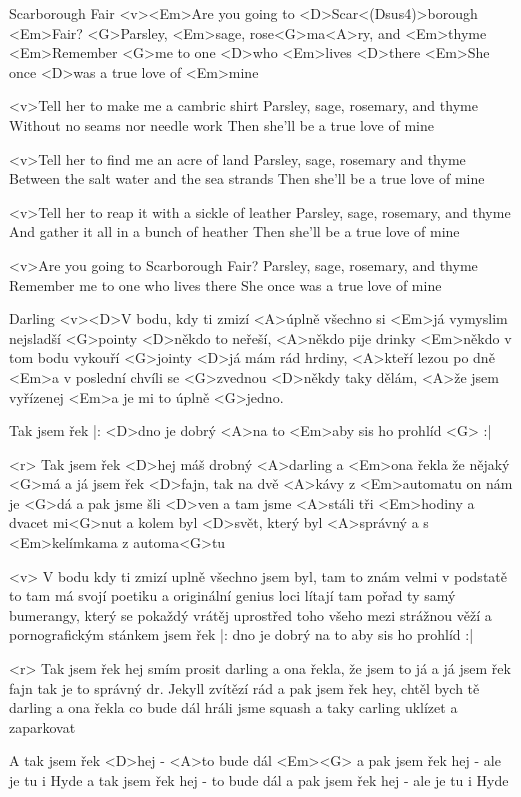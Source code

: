 \begin{song}[Lidová]{83}{Scarborough Fair}{}
	<v><Em>Are you going to <D>Scar<(Dsus4)>borough <Em>Fair?
	<G>Parsley, <Em>sage, rose<G>ma<A>ry, and <Em>thyme
	<Em>Remember <G>me to one <D>who <Em>lives <D>there
	<Em>She once <D>was a true love of <Em>mine

	<v>Tell her to make me a cambric shirt
	Parsley, sage, rosemary, and thyme
	Without no seams nor needle work
	Then she'll be a true love of mine

	<v>Tell her to find me an acre of land
	Parsley, sage, rosemary and thyme
	Between the salt water and the sea strands
	Then she'll be a true love of mine

	<v>Tell her to reap it with a sickle of leather
	Parsley, sage, rosemary, and thyme
	And gather it all in a bunch of heather
	Then she'll be a true love of mine

	<v>Are you going to Scarborough Fair?
	Parsley, sage, rosemary, and thyme
	Remember me to one who lives there
	She once was a true love of mine
\end{song}

\begin{song}{84}{Darling}{}
	<v><D>V bodu, kdy ti zmizí <A>úplně všechno
	si <Em>já vymyslim nejsladší <G>pointy
	<D>někdo to neřeší, <A>někdo pije drinky
	<Em>někdo v tom bodu vykouří <G>jointy
	<D>já mám rád hrdiny, <A>kteří lezou po dně
	<Em>a v poslední chvíli se <G>zvednou
	<D>někdy taky dělám, <A>že jsem vyřízenej
	<Em>a je mi to úplně <G>jedno.

	Tak jsem řek
	|: <D>dno je dobrý <A>na to <Em>aby sis ho prohlíd <G> :|

	<r> Tak jsem řek <D>hej máš drobný <A>darling
	a <Em>ona řekla že nějaký <G>má
	a já jsem řek <D>fajn, tak na dvě <A>kávy
	z <Em>automatu on nám je <G>dá
	a pak jsme šli <D>ven a tam jsme <A>stáli
	tři <Em>hodiny a dvacet mi<G>nut
	a kolem byl <D>svět, který byl <A>správný
	a s <Em>kelímkama z automa<G>tu

	<v> V bodu kdy ti zmizí uplně všechno
	jsem byl, tam to znám velmi
	v podstatě to tam má svojí poetiku
	a originální genius loci
	lítají tam pořad ty samý bumerangy, který se pokaždý vrátěj
	uprostřed toho všeho mezi strážnou věží
	a pornografickým stánkem
	jsem řek
	|: dno je dobrý na to aby sis ho prohlíd :|

	<r> Tak jsem řek hej smím prosit darling
	a ona řekla, že jsem to já
	a já jsem řek fajn tak je to správný
	dr. Jekyll zvítězí rád
	a pak jsem řek hey, chtěl bych tě darling
	a ona řekla co bude dál
	hráli jsme squash a taky carling
	uklízet a zaparkovat

	A tak jsem řek <D>hej - <A>to bude dál <Em><G>
	a pak jsem řek hej - ale je tu i Hyde
	a tak jsem řek hej - to bude dál
	a pak jsem řek hej - ale je tu i Hyde
\end{song}

